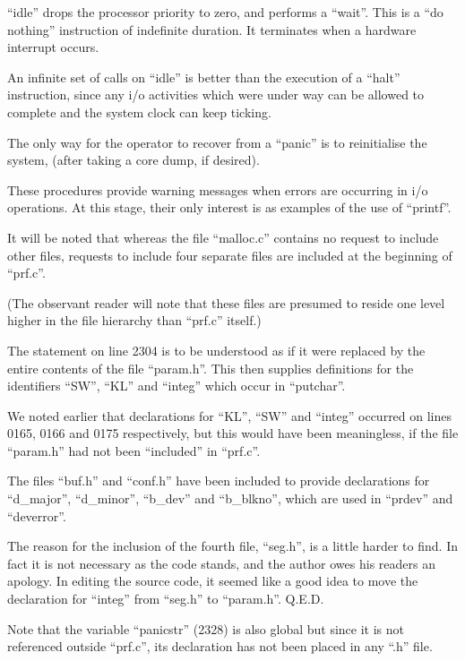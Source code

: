 ``idle'' drops the processor priority to zero, and performs a
``wait''. This is a ``do nothing''
instruction of indefinite duration. It terminates when a
hardware interrupt occurs.

An infinite set of calls on ``idle'' is
better than the execution of a ``halt''
instruction, since any i/o activities
which were under way can be allowed to
complete and the system clock can keep
ticking.

The only way for the operator to
recover from a ``panic'' is to reinitialise the system, (after taking a core
dump, if desired).
\ed



These procedures provide warning messages when errors are occurring in i/o
operations. At this stage, their only
interest is as examples of the use of
``printf''.



It will be noted that whereas the file
``malloc.c'' contains no request to
include other files, requests to
include four separate files are
included at the beginning of ``prf.c''.

(The observant reader will note that
these files are presumed to reside one
level higher in the file hierarchy than
``prf.c'' itself.)


The statement on line 2304 is to be
understood as if it were replaced by
the entire contents of the file
``param.h''. This then supplies definitions for the identifiers ``SW'', ``KL''
and ``integ'' which occur in ``putchar''.

We noted earlier that declarations for
``KL'', ``SW'' and ``integ'' occurred on
lines 0165, 0166 and 0175 respectively,
but this would have been meaningless,
if the file ``param.h'' had not been
``included'' in ``prf.c''.

The files ``buf.h'' and ``conf.h'' have
been included to provide declarations
for ``d\_major'', ``d\_minor'', ``b\_dev'' and
``b\_blkno'', which are used in ``prdev''
and ``deverror''.

The reason for the inclusion of the
fourth file, ``seg.h'', is a little
harder to find. In fact it is not
necessary as the code stands, and the
author owes his readers an apology. In
editing the source code, it seemed like
a good idea to move the declaration for
``integ'' from ``seg.h'' to ``param.h''.
Q.E.D.

Note that the variable ``panicstr''
(2328) is also global but since it is
not referenced outside ``prf.c'', its
declaration has not been placed in any
``.h'' file.

